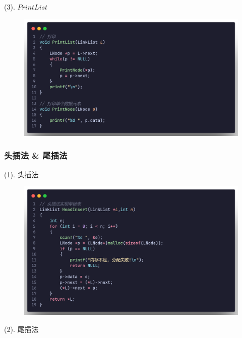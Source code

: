 (3). $PrintList$

\begin{figure}[H]
    \centering
    \includegraphics[scale=0.2]{"figure/Note/LinearList/SlPrint.png"}
\end{figure}


\subsubsection{头插法 \& 尾插法}

(1). 头插法

\begin{figure}[H]
    \centering
    \includegraphics[scale=0.2]{"figure/Note/LinearList/SlHInsert.png"}
\end{figure}

(2). 尾插法

